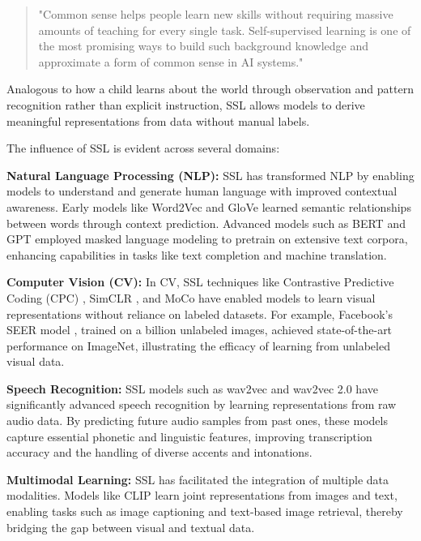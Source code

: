 \begin{quote}
    "Common sense helps people learn new skills without requiring massive amounts of teaching for every single task. Self-supervised learning is one of the most promising ways to build such background knowledge and approximate a form of common sense in AI systems."
\end{quote}

Analogous to how a child learns about the world through observation and pattern recognition rather than explicit instruction, SSL allows models to derive meaningful representations from data without manual labels.

The influence of SSL is evident across several domains:

\textbf{Natural Language Processing (NLP):} SSL has transformed NLP by enabling models to understand and generate human language with improved contextual awareness. Early models like Word2Vec \citep{mikolov2013efficient} and GloVe \citep{pennington2014glove} learned semantic relationships between words through context prediction. Advanced models such as BERT \citep{devlin2019bert} and GPT \citep{radford2019language} employed masked language modeling to pretrain on extensive text corpora, enhancing capabilities in tasks like text completion and machine translation.

\textbf{Computer Vision (CV):} In CV, SSL techniques like Contrastive Predictive Coding (CPC) \citep{oord2018representation}, SimCLR \citep{chen2020simple}, and MoCo \citep{he2020momentum} have enabled models to learn visual representations without reliance on labeled datasets. For example, Facebook's SEER model \citep{goyal2021self}, trained on a billion unlabeled images, achieved state-of-the-art performance on ImageNet, illustrating the efficacy of learning from unlabeled visual data.

\textbf{Speech Recognition:} SSL models such as wav2vec \citep{schneider2019wav2vec} and wav2vec 2.0 \citep{baevski2020wav2vec} have significantly advanced speech recognition by learning representations from raw audio data. By predicting future audio samples from past ones, these models capture essential phonetic and linguistic features, improving transcription accuracy and the handling of diverse accents and intonations.

\textbf{Multimodal Learning:} SSL has facilitated the integration of multiple data modalities. Models like CLIP \citep{radford2021learning} learn joint representations from images and text, enabling tasks such as image captioning and text-based image retrieval, thereby bridging the gap between visual and textual data.

